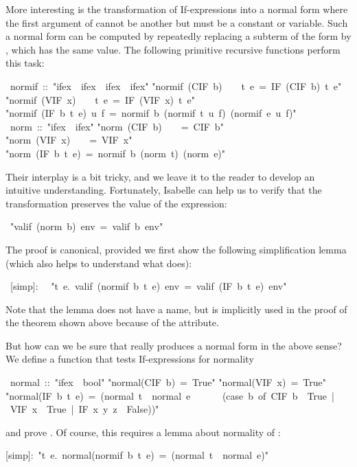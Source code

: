 \begin{isabelle}
\begin{isamarkuptext}
More interesting is the transformation of If-expressions into a normal form
where the first argument of  cannot be another  but
must be a constant or variable. Such a normal form can be computed by
repeatedly replacing a subterm of the form  by
, which has the same value. The following
primitive recursive functions perform this task:%
\end{isamarkuptext}%
~normif~::~{"}ifex~{\isasymRightarrow}~ifex~{\isasymRightarrow}~ifex~{\isasymRightarrow}~ifex{"}\isanewline
{}\isanewline
{"}normif~(CIF~b)~~~~t~e~=~IF~(CIF~b)~t~e{"}\isanewline
{"}normif~(VIF~x)~~~~t~e~=~IF~(VIF~x)~t~e{"}\isanewline
{"}normif~(IF~b~t~e)~u~f~=~normif~b~(normif~t~u~f)~(normif~e~u~f){"}\isanewline
\isanewline
{}~norm~::~{"}ifex~{\isasymRightarrow}~ifex{"}\isanewline
{}\isanewline
{"}norm~(CIF~b)~~~~=~CIF~b{"}\isanewline
{"}norm~(VIF~x)~~~~=~VIF~x{"}\isanewline
{"}norm~(IF~b~t~e)~=~normif~b~(norm~t)~(norm~e){"}%
\begin{isamarkuptext}%
\noindent
Their interplay is a bit tricky, and we leave it to the reader to develop an
intuitive understanding. Fortunately, Isabelle can help us to verify that the
transformation preserves the value of the expression:%
\end{isamarkuptext}%
~{"}valif~(norm~b)~env~=~valif~b~env{"}%
\begin{isamarkuptext}%
\noindent
The proof is canonical, provided we first show the following simplification
lemma (which also helps to understand what  does):%
\end{isamarkuptext}%
~[simp]:\isanewline
~~{"}{\isasymforall}t~e.~valif~(normif~b~t~e)~env~=~valif~(IF~b~t~e)~env{"}%
\begin{isamarkuptext}%
\noindent
Note that the lemma does not have a name, but is implicitly used in the proof
of the theorem shown above because of the \isa{[simp]} attribute.

But how can we be sure that  really produces a normal form in
the above sense? We define a function that tests If-expressions for normality%
\end{isamarkuptext}%
~normal~::~{"}ifex~{\isasymRightarrow}~bool{"}\isanewline
{}\isanewline
{"}normal(CIF~b)~=~True{"}\isanewline
{"}normal(VIF~x)~=~True{"}\isanewline
{"}normal(IF~b~t~e)~=~(normal~t~{\isasymand}~normal~e~{\isasymand}\isanewline
~~~~~(case~b~of~CIF~b~{\isasymRightarrow}~True~|~VIF~x~{\isasymRightarrow}~True~|~IF~x~y~z~{\isasymRightarrow}~False)){"}%
\begin{isamarkuptext}%
\noindent
and prove . Of course, this requires a lemma about
normality of :%
\end{isamarkuptext}%
[simp]:~{"}{\isasymforall}t~e.~normal(normif~b~t~e)~=~(normal~t~{\isasymand}~normal~e){"}\end{isabelle}%
